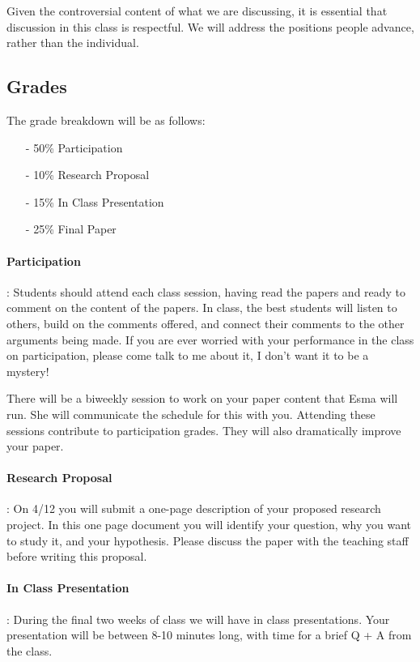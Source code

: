 \documentclass[12pt,letterpaper]{article}
\numberwithin{equation}{section}
\begin{document}
\noindent Given the controversial content of what we are discussing, it is essential that discussion in this class is respectful.  We will address the positions people advance, rather than the individual.  



\subsection{Grades}
\noindent The grade breakdown will be as follows:

\begin{itemize}
\item[-] 50\% Participation
\item[-] 10\% Research Proposal
\item[-] 15\% In Class Presentation
\item[-] 25\% Final Paper
\end{itemize}	

\paragraph{Participation}: Students should attend each class session, having read the papers and ready to comment on the content of the papers.  In class, the best students will listen to others, build on the comments offered, and connect their comments to the other arguments being made.  If you are ever worried with your performance in the class on participation, please come talk to me about it, I don't want it to be a mystery!

There will be a biweekly session to work on your paper content that Esma will run.  She will communicate the schedule for this with you.  Attending these sessions contribute to participation grades.  They will also dramatically improve your paper.  


\paragraph{Research Proposal}: On 4/12 you will submit a one-page description of your proposed research project.  In this one page document you will identify your question, why you want to study it, and your hypothesis.  Please discuss the paper with the teaching staff before writing this proposal.  

\paragraph{In Class Presentation}: During the final two weeks of class we will have in class presentations.  Your presentation will be between 8-10 minutes long, with time for a brief Q + A from the class. 
\end{document}
